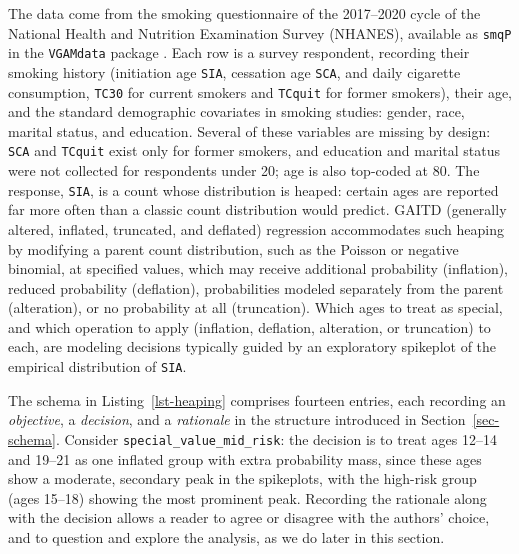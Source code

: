 \documentclass[aoas]{imsart}
\begin{document}
The data come from the smoking questionnaire of the 2017--2020 cycle of
the National Health and Nutrition Examination Survey (NHANES), available
as \texttt{smqP} in the \texttt{VGAMdata} package \citep{VGAMdata}. Each
row is a survey respondent, recording their smoking history (initiation
age \texttt{SIA}, cessation age \texttt{SCA}, and daily cigarette
consumption, \texttt{TC30} for current smokers and \texttt{TCquit} for
former smokers), their age, and the standard demographic covariates in
smoking studies: gender, race, marital status, and education. Several of
these variables are missing by design: \texttt{SCA} and \texttt{TCquit}
exist only for former smokers, and education and marital status were not
collected for respondents under 20; age is also top-coded at 80. The
response, \texttt{SIA}, is a count whose distribution is heaped: certain
ages are reported far more often than a classic count distribution would
predict. GAITD (generally altered, inflated, truncated, and deflated)
regression accommodates such heaping by modifying a parent count
distribution, such as the Poisson or negative binomial, at specified
values, which may receive additional probability (inflation), reduced
probability (deflation), probabilities modeled separately from the
parent (alteration), or no probability at all (truncation). Which ages
to treat as special, and which operation to apply (inflation, deflation,
alteration, or truncation) to each, are modeling decisions typically
guided by an exploratory spikeplot of the empirical distribution of
\texttt{SIA}.

The schema in Listing~\ref{lst-heaping} comprises fourteen entries, each
recording an \emph{objective}, a \emph{decision}, and a \emph{rationale}
in the structure introduced in Section~\ref{sec-schema}. Consider
\texttt{special\_value\_mid\_risk}: the decision is to treat ages 12--14
and 19--21 as one inflated group with extra probability mass, since
these ages show a moderate, secondary peak in the spikeplots, with the
high-risk group (ages 15--18) showing the most prominent peak. Recording
the rationale along with the decision allows a reader to agree or
disagree with the authors' choice, and to question and explore the
analysis, as we do later in this section.
\end{document}
